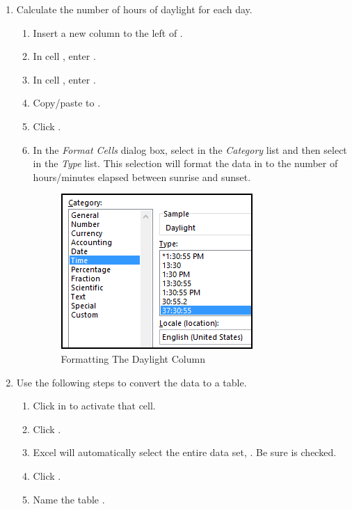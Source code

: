 \begin{enumbox}
	\begin{enumerate}
		\item Calculate the number of hours of daylight for each day.
		
		\begin{enumerate}
			\item Insert a new column to the left of .
			\item In cell , enter .
			\item In cell , enter .
			\item Copy/paste  to .
			\item Click . 
			\item In the \textit{Format Cells} dialog box, select  in the \textit{Category} list and then select  in the \textit{Type} list. This selection will format the data in  to the number of hours/minutes elapsed between sunrise and sunset.
			
			\begin{figure}[H]
				\centering
				\includegraphics[width=\maxwidth{.75\linewidth}]{gfx/ch09_fig80}
				\caption{Formatting The Daylight Column}
				\label{09:fig80}
			\end{figure}
			
			
		\end{enumerate}
		
		\item Use the following steps to convert the data to a table.
		
		\begin{enumerate}
			\item Click in  to activate that cell.
			\item Click .
			\item Excel will automatically select the entire data set, . Be sure  is checked.
			\item Click .
			\item Name the table .
		\end{enumerate}
		

\end{enumerate}
\end{enumbox}
